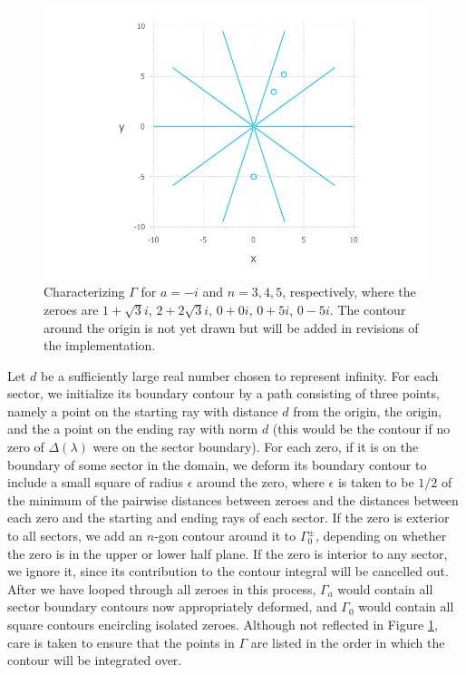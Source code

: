 \documentclass[11pt, oneside, a4paper]{article}
\begin{document}
\begin{figure}[htpb!]
      \includegraphics[width=\linewidth]{contourPlot3.pdf}
    \endminipage
    \caption{Characterizing $\Gamma$ for $a=-i$ and $n=3, 4, 5$, respectively, where the zeroes are $1+\sqrt{3}i$, $2+2\sqrt{3}i$, $0+0i$, $0+5i$, $0-5i$. The contour around the origin is not yet drawn but will be added in revisions of the implementation.}
    \label{fig:contourPlot}
\end{figure}

Let $d$ be a sufficiently large real number chosen to represent infinity. For each sector, we initialize its boundary contour by a path consisting of three points, namely a point on the starting ray with distance $d$ from the origin, the origin, and the a point on the ending ray with norm $d$ (this would be the contour if no zero of $\Delta(\lambda)$ were on the sector boundary). For each zero, if it is on the boundary of some sector in the domain, we deform its boundary contour to include a small square of radius $\epsilon$ around the zero, where $\epsilon$ is taken to be $1/2$ of the minimum of the pairwise distances between zeroes and the distances between each zero and the starting and ending rays of each sector. If the zero is exterior to all sectors, we add an $n$-gon contour around it to $\Gamma_0^{\pm}$, depending on whether the zero is in the upper or lower half plane. If the zero is interior to any sector, we ignore it, since its contribution to the contour integral will be cancelled out. After we have looped through all zeroes in this process, $\Gamma_a$ would contain all sector boundary contours now appropriately deformed, and $\Gamma_0$ would contain all square contours encircling isolated zeroes. Although not reflected in Figure \ref{fig:contourPlot}, care is taken to ensure that the points in $\Gamma$ are listed in the order in which the contour will be integrated over. 
\end{document}
